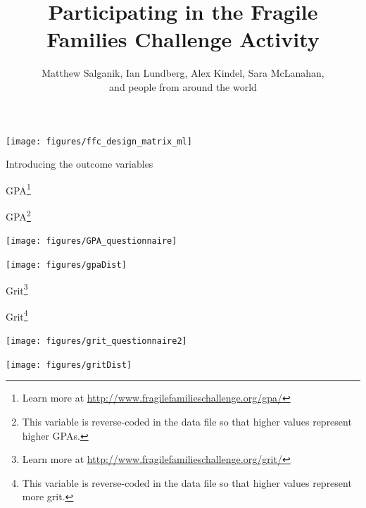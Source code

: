 \documentclass[aspectratio=169]{beamer}
\title{Participating in the Fragile Families Challenge Activity}
\author{{\small Matthew Salganik, Ian Lundberg, Alex Kindel, Sara McLanahan,\\and people from around the world}}
\date[]{
\begin{flushleft}{\tiny Funding for FFCWS provided by NICHD (R01HD36916, R01HD39135, R01HD40421) and a consortium of private foundations, including the Robert Wood Johnson Foundation. Funding for FFC provided by the Russell Sage Foundation, NSF, \& the Overdeck Fund. FFC Board of Advisors: Jeanne Brooks-Gunn, Kathryn Edin, Barbara Engelhardt, Irwin Garfinkel, Moritz Hardt, Dean Knox, Nicholas Lemann, Karen Levy, Sara McLanahan, Arvind Narayanan, Timothy Nelson, Matthew Salganik, Brandon Stewart \& Duncan Watts.}
\end{flushleft}
\begin{flushright}
\texttt{[image: figures/cc-by.png]}
\end{flushright}
}
\begin{document}
\frame{\titlepage}
\begin{frame}

\begin{center}
\texttt{[image: figures/ffc\_design\_matrix\_ml]}
\end{center}

\end{frame}
\begin{frame}

\Large{
\begin{center}
Introducing the outcome variables
\end{center}
}

\end{frame}
\begin{frame}

\Large{
\begin{center}
GPA\footnote{Learn more at \url{http://www.fragilefamilieschallenge.org/gpa/}}
\end{center}
}

\end{frame}
\begin{frame}{GPA\footnote{This variable is reverse-coded in the data file so that higher values represent higher GPAs.}}

\centering
\texttt{[image: figures/GPA\_questionnaire]}

\end{frame}
\begin{frame}

\centering
\texttt{[image: figures/gpaDist]}

\end{frame}

\begin{frame}

\Large{
\begin{center}
Grit\footnote{Learn more at \url{http://www.fragilefamilieschallenge.org/grit/}} 
\end{center}
}

\end{frame}
\begin{frame}{Grit\footnote{This variable is reverse-coded in the data file so that higher values represent more grit.}}

\centering
\texttt{[image: figures/grit\_questionnaire2]}

\end{frame}
\begin{frame}

\centering
\texttt{[image: figures/gritDist]}

\end{frame}
\end{document}
